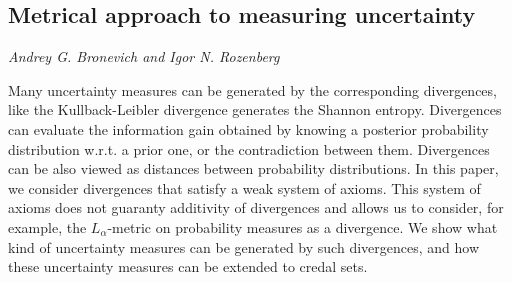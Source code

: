 \documentclass[../booklet.tex]{subfiles}
\begin{document}
\subsection[Metrical approach to measuring uncertainty. {\it Andrey G. Bronevich and Igor N. Rozenberg}]{Metrical approach to measuring uncertainty}
 

\begin{center}
  {\it Andrey G. Bronevich and Igor N. Rozenberg}
\end{center}



Many uncertainty measures can be generated by the corresponding divergences, like the Kullback-Leibler divergence generates the Shannon entropy. Divergences can evaluate the information gain obtained by knowing a posterior probability distribution w.r.t. a prior one, or the contradiction between them. Divergences can be also viewed as distances between probability distributions.  
In this paper, we consider divergences that satisfy a weak system of axioms. This system of axioms does not guaranty additivity of divergences and allows us to consider, for example, the ${L_\alpha }$-metric on probability measures as a divergence. We show what kind of uncertainty measures can be generated by such divergences, and how these uncertainty measures can be extended to credal sets.

\end{document}
